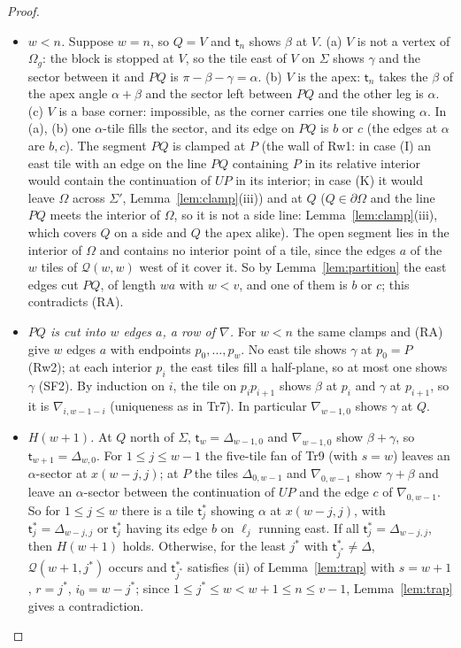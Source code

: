 \documentclass[11pt,reqno]{amsart}
\theoremstyle{plain}
\theoremstyle{definition}
\begin{document}
\begin{proof}
\begin{itemize}
\item[\textbf{Rw3}] \emph{$w<n$.} Suppose $w=n$, so $Q=V$ and $\mathsf t_n$ shows $\beta$ at $V$. (a) $V$ is not a vertex of $\Omega_{g}$: the block is stopped at $V$, so the tile east of $V$ on $\Sigma$ shows $\gamma$ and the sector between it and $PQ$ is $\pi-\beta-\gamma=\alpha$. (b) $V$ is the apex: $\mathsf t_n$ takes the $\beta$ of the apex angle $\alpha+\beta$ and the sector left between $PQ$ and the other leg is $\alpha$. (c) $V$ is a base corner: impossible, as the corner carries one tile showing $\alpha$. In (a), (b) one $\alpha$-tile fills the sector, and its edge on $PQ$ is $b$ or $c$ (the edges at $\alpha$ are $b,c$). The segment $PQ$ is clamped at $P$ (the wall of Rw1: in case (I) an east tile with an edge on the line $PQ$ containing $P$ in its relative interior would contain the continuation of $UP$ in its interior; in case (K) it would leave $\Omega$ across $\Sigma'$, Lemma~\ref{lem:clamp}(iii)) and at $Q$ ($Q\in\partial\Omega$ and the line $PQ$ meets the interior of $\Omega$, so it is not a side line: Lemma~\ref{lem:clamp}(iii), which covers $Q$ on a side and $Q$ the apex alike). The open segment lies in the interior of $\Omega$ and contains no interior point of a tile, since the edges $a$ of the $w$ tiles of $\mathcal Q(w,w)$ west of it cover it. So by Lemma~\ref{lem:partition} the east edges cut $PQ$, of length $wa$ with $w<v$, and one of them is $b$ or $c$; this contradicts (RA).
\item[\textbf{Rw4}] \emph{$PQ$ is cut into $w$ edges $a$, a row of $\nabla$.} For $w<n$ the same clamps and (RA) give $w$ edges $a$ with endpoints $p_0,\dots,p_w$. No east tile shows $\gamma$ at $p_0=P$ (Rw2); at each interior $p_i$ the east tiles fill a half-plane, so at most one shows $\gamma$ (SF2). By induction on $i$, the tile on $p_ip_{i+1}$ shows $\beta$ at $p_i$ and $\gamma$ at $p_{i+1}$, so it is $\nabla_{i,w-1-i}$ (uniqueness as in Tr7). In particular $\nabla_{w-1,0}$ shows $\gamma$ at $Q$.
\item[\textbf{Rw5}] \emph{$H(w+1)$.} At $Q$ north of $\Sigma$, $\mathsf t_w=\Delta_{w-1,0}$ and $\nabla_{w-1,0}$ show $\beta+\gamma$, so $\mathsf t_{w+1}=\Delta_{w,0}$. For $1\le j\le w-1$ the five-tile fan of Tr9 (with $s=w$) leaves an $\alpha$-sector at $x(w-j,j)$; at $P$ the tiles $\Delta_{0,w-1}$ and $\nabla_{0,w-1}$ show $\gamma+\beta$ and leave an $\alpha$-sector between the continuation of $UP$ and the edge $c$ of $\nabla_{0,w-1}$. So for $1\le j\le w$ there is a tile $\mathsf t^\ast_j$ showing $\alpha$ at $x(w-j,j)$, with $\mathsf t^\ast_j=\Delta_{w-j,j}$ or $\mathsf t^\ast_j$ having its edge $b$ on $\ell_j$ running east. If all $\mathsf t^\ast_j=\Delta_{w-j,j}$, then $H(w+1)$ holds. Otherwise, for the least $j^*$ with $\mathsf t^\ast_{j^*}\ne\Delta$, $\mathcal Q(w+1,j^*)$ occurs and $\mathsf t^\ast_{j^*}$ satisfies (ii) of Lemma~\ref{lem:trap} with $s=w+1$, $r=j^*$, $i_0=w-j^*$; since $1\le j^*\le w<w+1\le n\le v-1$, Lemma~\ref{lem:trap} gives a contradiction.

\end{itemize}
\end{proof}
\end{document}
